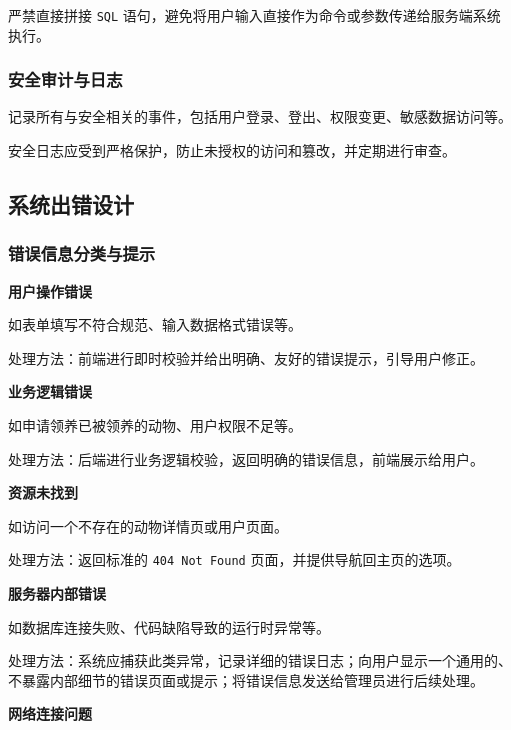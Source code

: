 \documentclass[12pt,a4paper,UTF8]{article}
\begin{document}
严禁直接拼接 \verb|SQL| 语句，避免将用户输入直接作为命令或参数传递给服务端系统执行。

\subsubsection{安全审计与日志}

记录所有与安全相关的事件，包括用户登录、登出、权限变更、敏感数据访问等。

安全日志应受到严格保护，防止未授权的访问和篡改，并定期进行审查。

\subsection{系统出错设计}

\subsubsection{错误信息分类与提示}

\noindent\textbf{用户操作错误}

如表单填写不符合规范、输入数据格式错误等。

处理方法：前端进行即时校验并给出明确、友好的错误提示，引导用户修正。

\vspace{0.25cm}

\noindent\textbf{业务逻辑错误}

如申请领养已被领养的动物、用户权限不足等。

处理方法：后端进行业务逻辑校验，返回明确的错误信息，前端展示给用户。

\vspace{0.25cm}

\noindent\textbf{资源未找到}

如访问一个不存在的动物详情页或用户页面。

处理方法：返回标准的 \verb|404 Not Found| 页面，并提供导航回主页的选项。

\vspace{0.25cm}

\noindent\textbf{服务器内部错误}

如数据库连接失败、代码缺陷导致的运行时异常等。

处理方法：系统应捕获此类异常，记录详细的错误日志；向用户显示一个通用的、不暴露内部细节的错误页面或提示；将错误信息发送给管理员进行后续处理。

\vspace{0.25cm}

\noindent\textbf{网络连接问题}
\end{document}
